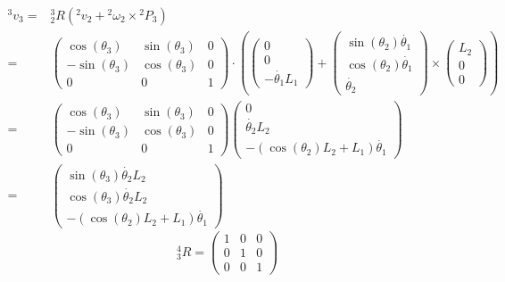 \documentclass[10pt,a4paper]{article}
\begin{document}
\begin{align*}
  {}^{3}v_{3} = & {}^{3}_{2}R \left( {}^{2}v_{2} + {}^{2}\omega_{2} \times {}^{2}P_{3} \right)\\
  = & \begin{pmatrix}
    \cos(\theta_{3}) & \sin(\theta_{3}) & 0\\
    -\sin(\theta_{3}) & \cos(\theta_{3}) & 0\\
    0 & 0 & 1
  \end{pmatrix} \cdot \left(
            \begin{pmatrix} 0\\0\\-\dot{\theta_{1}}L_{1} \end{pmatrix} +
  \begin{pmatrix}
    \sin(\theta_{2})\dot{\theta_{1}} \\ \cos(\theta_{2})\dot{\theta_{1}} \\ \dot{\theta_{2}}
  \end{pmatrix} \times
  \begin{pmatrix}
    L_{2}\\0\\0
  \end{pmatrix}
  \right)\\
  = & \begin{pmatrix}
    \cos(\theta_{3}) & \sin(\theta_{3}) & 0\\
    -\sin(\theta_{3}) & \cos(\theta_{3}) & 0\\
    0 & 0 & 1
  \end{pmatrix} \begin{pmatrix}
    0\\
    \dot{\theta_{2}}L_{2}\\
    -\left( \cos(\theta_{2})L_{2} + L_{1} \right) \dot{\theta_{1}}
  \end{pmatrix}\\
  = & \begin{pmatrix}
    \sin(\theta_{3}) \dot{\theta_{2}} L_{2}\\
    \cos(\theta_{3}) \dot{\theta_{2}} L_{2}\\
    -\left( \cos(\theta_{2})L_{2} + L_{1} \right) \dot{\theta_{1}}
  \end{pmatrix}
\end{align*}
\begin{equation*}
  {}_{3}^{4}R = \begin{pmatrix}
    1 & 0 & 0\\
    0 & 1 & 0\\
    0 & 0 & 1
  \end{pmatrix}
\end{equation*}
\end{document}
